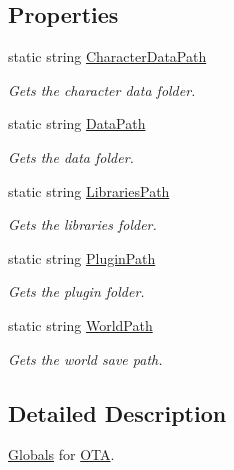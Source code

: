 \subsection*{Properties}
\begin{DoxyCompactItemize}
\item 
static string \hyperlink{classOTA_1_1Globals_a49e428f54c23031933ef157260562220}{Character\+Data\+Path}
\begin{DoxyCompactList}\small\item\em Gets the character data folder. \end{DoxyCompactList}\item 
static string \hyperlink{classOTA_1_1Globals_adcc849904fa894695354aa9994c85b45}{Data\+Path}
\begin{DoxyCompactList}\small\item\em Gets the data folder. \end{DoxyCompactList}\item 
static string \hyperlink{classOTA_1_1Globals_a8a44939c13246f2f6bb236bb07e782da}{Libraries\+Path}
\begin{DoxyCompactList}\small\item\em Gets the libraries folder. \end{DoxyCompactList}\item 
static string \hyperlink{classOTA_1_1Globals_af63247199be40f4f0d91a2a1fe6cc763}{Plugin\+Path}
\begin{DoxyCompactList}\small\item\em Gets the plugin folder. \end{DoxyCompactList}\item 
static string \hyperlink{classOTA_1_1Globals_abb9120b8f19913bede3e1f7710eb7059}{World\+Path}
\begin{DoxyCompactList}\small\item\em Gets the world save path. \end{DoxyCompactList}\end{DoxyCompactItemize}


\subsection{Detailed Description}
\hyperlink{classOTA_1_1Globals}{Globals} for \hyperlink{namespaceOTA}{O\+T\+A}. 



